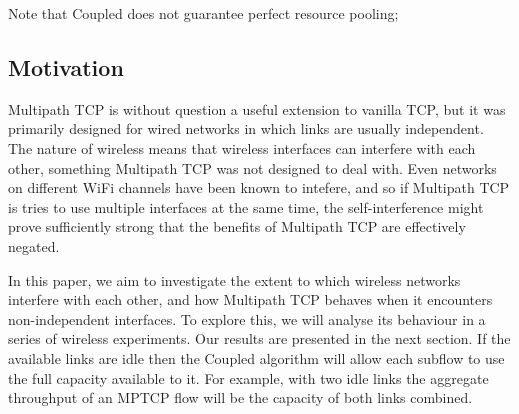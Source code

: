 Note that Coupled does not guarantee perfect resource pooling;

\subsection{Motivation}
\label{sec:bg:motivation}
Multipath TCP is without question a useful extension to vanilla TCP, but it was
primarily designed for wired networks in which links are usually independent.
The nature of wireless means that wireless interfaces can interfere with each
other, something Multipath TCP was not designed to deal with. Even networks on
different WiFi channels have been known to intefere, and so if Multipath TCP is
tries to use multiple interfaces at the same time, the self-interference might
prove sufficiently strong that the benefits of Multipath TCP are effectively
negated.

In this paper, we aim to investigate the extent to which wireless networks
interfere with each other, and how Multipath TCP behaves when it encounters
non-independent interfaces. To explore this, we will analyse its behaviour in a
series of wireless experiments. Our results are presented in the next section.
If the available links are idle then the Coupled algorithm will allow each
subflow to use the full capacity available to it. For example, with two idle
links the aggregate throughput of an MPTCP flow will be the capacity of both
links combined.
